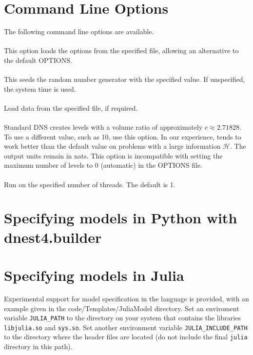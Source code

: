 \documentclass[article]{jss}
\begin{document}
\appendix
\section{Command Line Options}\label{sec:command_line_options}
The following command line options are available.\\

\\
This option loads the  options from the specified file, allowing
an alternative to the default OPTIONS.\\

\\
This seeds the random number generator with the specified value. If unspecified, the system time is used.\\

\\
Load data from the specified file, if required.\\

\\
Standard DNS creates levels with a volume ratio of approximately
$e\approx 2.71828$. To use a different value, such as 10, use this option.
In our experience,  tends to work better than the default
value on problems with a large information $\mathcal{H}$.
The output units remain in nats.
This option is incompatible with setting the maximum number of levels to 0
(automatic) in the OPTIONS file.
\\

\\
Run on the specified number of threads. The default is 1.

\section{Specifying models in Python with dnest4.builder}


\section{Specifying models in Julia}
Experimental support for model specification in the
 language is provided, with an example given in the
code/Templates/JuliaModel directory.
Set an enviroment variable {\tt JULIA\_PATH} to the directory on your
system that contains the libraries {\tt libjulia.so} and
{\tt sys.so}. Set another environment variable {\tt JULIA\_INCLUDE\_PATH}
to the directory where the  header files are located
(do not include the final {\tt julia} directory in this path).
\end{document}
